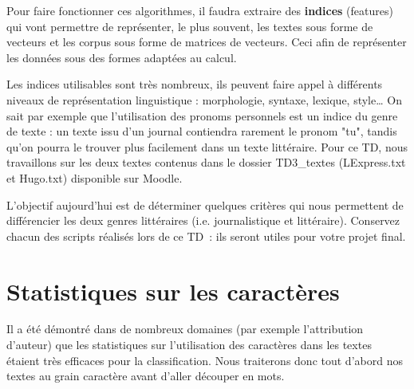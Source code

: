  Pour faire fonctionner ces algorithmes, il faudra extraire des \textbf{indices} (features) qui vont permettre de représenter, le plus souvent, les textes sous forme de vecteurs et les corpus sous forme de matrices de vecteurs. Ceci afin de représenter les données sous des formes adaptées au calcul.

 Les indices utilisables sont très nombreux, ils peuvent faire appel à différents niveaux de représentation linguistique : morphologie, syntaxe, lexique, style\dots 
 On sait par exemple que l'utilisation des pronoms personnels est un indice du genre de texte : un texte issu d'un journal contiendra rarement le pronom "tu", tandis qu'on pourra le trouver plus facilement dans un texte littéraire.
Pour ce TD, nous travaillons sur les deux textes contenus dans le dossier TD3\_textes (LExpress.txt et Hugo.txt) disponible sur Moodle.

 L'objectif aujourd'hui est de déterminer quelques critères qui nous permettent de différencier les deux genres littéraires (i.e. journalistique et littéraire).
Conservez chacun des scripts réalisés lors de ce TD : ils seront utiles pour votre projet final. 


\section{Statistiques sur les caractères}

Il a été démontré dans de nombreux domaines (par exemple l'attribution d'auteur) que les statistiques sur l'utilisation des caractères dans les textes étaient très efficaces pour la classification.
 Nous traiterons donc tout d'abord nos textes au grain caractère avant d'aller découper en mots.

